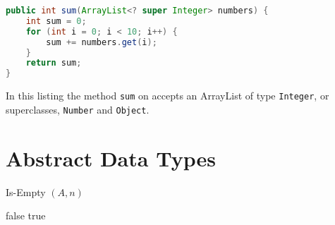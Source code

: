\documentclass[12pt letter]{report}
\begin{document}
\begin{lstlisting}[language=Java]
public int sum(ArrayList<? super Integer> numbers) {
    int sum = 0;
    for (int i = 0; i < 10; i++) {
        sum += numbers.get(i);
    }
    return sum;
}
\end{lstlisting}

In this listing the method \lstinline{sum} on accepts an ArrayList of type \lstinline{Integer}, or superclasses,
\lstinline{Number} and \lstinline{Object}.

\chapter{Abstract Data Types}



\begin{algorithm}[H]
  \caption{Is-Empty $ \left( A, n \right) $}
  \begin{algorithmic}[1]
    \State \Return false
    \EndIf
    \State \Return true
    \EndFor
  \end{algorithmic}
\end{algorithm}
\end{document}
